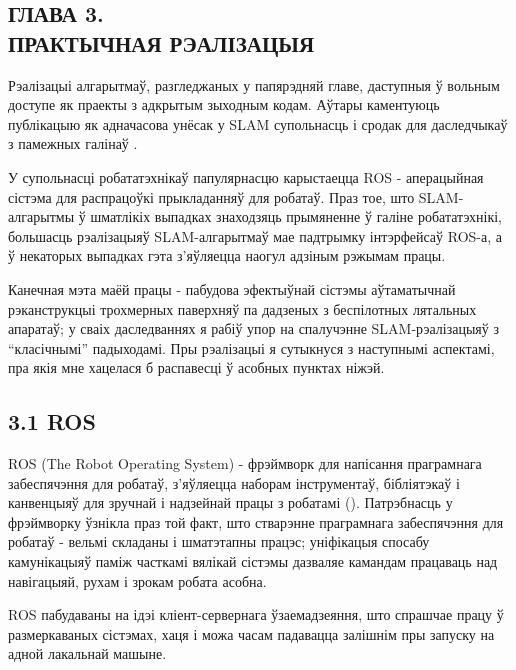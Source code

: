 \begin{center}
    \section*{ГЛАВА 3. \\ ПРАКТЫЧНАЯ РЭАЛІЗАЦЫЯ}
\end{center}

Рэалізацыі алгарытмаў, разгледжаных у папярэдняй главе, даступныя ў вольным доступе
як праекты з адкрытым зыходным кодам. Аўтары каментуюць публікацыю як адначасова
унёсак у SLAM супольнасць і сродак для даследчыкаў з памежных галінаў \cite{murORB2}.

У супольнасці робататэхнікаў папулярнасцю карыстаецца ROS - аперацыйная сістэма для
распрацоўкі прыкладанняў для робатаў. Праз тое, што SLAM-алгарытмы ў шматлікіх
выпадках знаходзяць прымяненне ў галіне робататэхнікі, большасць рэалізацыяў
SLAM-алгарытмаў мае падтрымку інтэрфейсаў ROS-а, а ў некаторых выпадках гэта з'яўляецца
наогул адзіным рэжымам працы.

Канечная мэта маёй працы - пабудова эфектыўнай сістэмы аўтаматычнай рэканструкцыі
трохмерных паверхняў па дадзеных з беспілотных лятальных апаратаў; у сваіх даследваннях
я рабіў упор на спалучэнне SLAM-рэалізацыяў з ``класічнымі'' падыходамі. Пры рэалізацыі я сутыкнуся
з наступнымі аспектамі, пра якія мне хацелася б распавесці ў асобных пунктах ніжэй.

\vspace{5mm}

\subsection*{3.1 ROS}

ROS (The Robot Operating System) - фрэймворк для напісання праграмнага забеспячэння
для робатаў, з'яўляецца наборам інструментаў, бібліятэкаў і
канвенцыяў для зручнай і надзейнай працы з робатамі (\cite{288}). Патрэбнасць у фрэймворку ўзнікла
праз той факт, што стварэнне праграмнага забеспячэння для робатаў -
вельмі складаны і шматэтапны працэс; уніфікацыя спосабу камунікацыяў паміж часткамі вялікай
сістэмы дазваляе камандам працаваць над навігацыяй, рухам і зрокам робата асобна.

ROS пабудаваны на ідэі кліент-сервернага ўзаемадзеяння, што спрашчае працу ў размеркаваных
сістэмах, хаця і можа часам падавацца залішнім пры запуску на адной лакальнай машыне.

